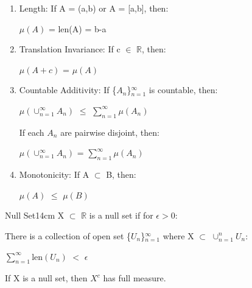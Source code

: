     \begin{enumerate}[label=(\alph*), leftmargin=2cm, itemsep=0.1cm]
        \item {\color{lblue} Length}:
            If A = (a,b) or A = [a,b], then:

            \hspace{0.5cm}
            $\mu(A)$ = len(A) = b-a

        \item {\color{lblue} Translation Invariance}:
            If c $\in$ $\mathbb{R}$, then:
            
            \hspace{0.5cm}
            $\mu(A+c)$ = $\mu(A)$

        \item {\color{lblue} Countable Additivity}:
            If \{$A_n$\}$_{n=1}^{\infty}$ is countable, then:

            \hspace{0.5cm}
            $\mu(\cup_{n=1}^{\infty} A_n)$
            $\leq$ $\sum_{n=1}^{\infty} \mu(A_n)$

            If each $A_n$ are pairwise disjoint, then:

            \hspace{0.5cm}
            $\mu(\cup_{n=1}^{\infty} A_n)$
            = $\sum_{n=1}^{\infty} \mu(A_n)$

        \item {\color{lblue} Monotonicity}:
            If A $\subset$ B, then:

            \hspace{0.5cm}
            $\mu(A)$ $\leq$ $\mu(B)$
    \end{enumerate}

    \newpage



    \begin{definition}{Null Set}{14cm}
        X $\subset$ $\mathbb{R}$ is a {\color{lblue} null set}
        if for $\epsilon > 0$:

        \hspace{0.5cm}
        There is a collection of open set \{$U_n$\}$_{n=1}^{\infty}$
        where X $\subset$ $\cup_{n=1}^n U_n$:

        \hspace{1cm}
        $\sum_{n=1}^{\infty} \text{len}(U_n)$ $<$ $\epsilon$

        If X is a null set, then $X^c$ has full measure.
    \end{definition}

